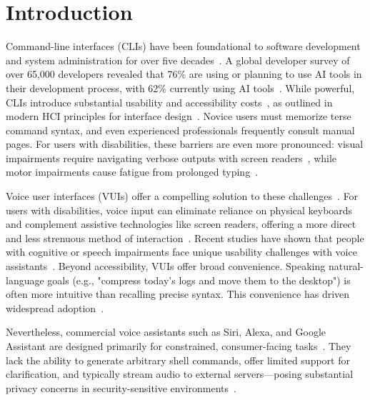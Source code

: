 \documentclass[a4paper,12pt]{article}
\begin{document}
\newpage
{}
\tableofcontents
\newpage
{}


\section{Introduction}

\noindent
Command-line interfaces (CLIs) have been foundational to software development and system administration for over five decades~\cite{ref1}. A global developer survey of over 65,000 developers revealed that 76\% are using or planning to use AI tools in their development process, with 62\% currently using AI tools~\cite{ref2}. While powerful, CLIs introduce substantial usability and accessibility costs~\cite{ref3}, as outlined in modern HCI principles for interface design~\cite{ref10}. Novice users must memorize terse command syntax, and even experienced professionals frequently consult manual pages. For users with disabilities, these barriers are even more pronounced: visual impairments require navigating verbose outputs with screen readers~\cite{ref3}, while motor impairments cause fatigue from prolonged typing~\cite{ref4}.

Voice user interfaces (VUIs) offer a compelling solution to these challenges~\cite{ref5}. For users with disabilities, voice input can eliminate reliance on physical keyboards and complement assistive technologies like screen readers, offering a more direct and less strenuous method of interaction~\cite{ref4}. Recent studies have shown that people with cognitive or speech impairments face unique usability challenges with voice assistants~\cite{ref28}. Beyond accessibility, VUIs offer broad convenience. Speaking natural-language goals (e.g., "compress today's logs and move them to the desktop") is often more intuitive than recalling precise syntax. This convenience has driven widespread adoption~\cite{ref7}.

Nevertheless, commercial voice assistants such as Siri, Alexa, and Google Assistant are designed primarily for constrained, consumer-facing tasks~\cite{ref8}. They lack the ability to generate arbitrary shell commands, offer limited support for clarification, and typically stream audio to external servers—posing substantial privacy concerns in security-sensitive environments~\cite{ref7,ref9}.
\end{document}
